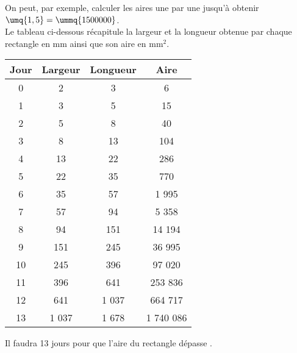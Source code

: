    On peut, par exemple, calculer les aires une par une jusqu'à obtenir $\umq{1,5} = \ummq{1500000}$. \\
   Le tableau ci-dessous récapitule la largeur et la longueur obtenue par chaque rectangle en mm ainsi que son aire en mm$^2$. \medskip

   \begin{tabular}{|c|c|c|c|}
      \hline
      Jour & Largeur & Longueur & Aire \\
      \hline
      0 & 2 & 3 & 6 \\
      \hline
      1 & 3 & 5 & 15 \\
      \hline
      2 & 5 & 8 & 40 \\
      \hline
      3 & 8 & 13 & 104 \\
      \hline
      4 & 13 & 22 & 286 \\
      \hline
      5 & 22 & 35 & 770 \\
      \hline
      6 & 35 & 57 & 1 995 \\
      \hline
      7 & 57 & 94 & 5 358 \\
      \hline
      8 & 94 & 151 & 14 194 \\
      \hline
      9 & 151 & 245 & 36 995 \\
      \hline
      10 & 245 & 396 & 97 020 \\
      \hline
      11 & 396 & 641 & 253 836 \\
      \hline
      12 & 641 & 1 037 & 664 717 \\
      \hline
      13 & 1 037 & 1 678 & 1 740 086 \\
      \hline
   \end{tabular}
   \medskip

   {\blue Il faudra 13 jours pour que l'aire du rectangle dépasse .}
